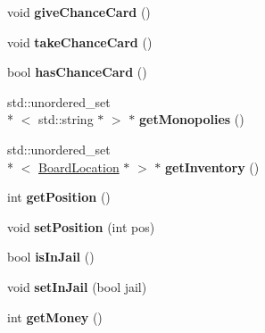 \begin{DoxyCompactItemize}
\item 
\hypertarget{classPlayer_a7433ae146d0c3dd73cb91ea5e96754f5}{void {\bfseries give\-Chance\-Card} ()}\label{classPlayer_a7433ae146d0c3dd73cb91ea5e96754f5}

\item 
\hypertarget{classPlayer_a15f319d424ddea1e7d52721a49b71709}{void {\bfseries take\-Chance\-Card} ()}\label{classPlayer_a15f319d424ddea1e7d52721a49b71709}

\item 
\hypertarget{classPlayer_a84e93bd5d7819117c065ead8218e346d}{bool {\bfseries has\-Chance\-Card} ()}\label{classPlayer_a84e93bd5d7819117c065ead8218e346d}

\item 
\hypertarget{classPlayer_abd9e6c52919dc2e1c31970e8e3e8bd03}{std\-::unordered\-\_\-set\\*
$<$ std\-::string $\ast$ $>$ $\ast$ {\bfseries get\-Monopolies} ()}\label{classPlayer_abd9e6c52919dc2e1c31970e8e3e8bd03}

\item 
\hypertarget{classPlayer_a29dd77d1aba8fba1f13318b90e635d63}{std\-::unordered\-\_\-set\\*
$<$ \hyperlink{classBoardLocation}{Board\-Location} $\ast$ $>$ $\ast$ {\bfseries get\-Inventory} ()}\label{classPlayer_a29dd77d1aba8fba1f13318b90e635d63}

\item 
\hypertarget{classPlayer_a67ac500ff74f722152ea44afcd29a7ab}{int {\bfseries get\-Position} ()}\label{classPlayer_a67ac500ff74f722152ea44afcd29a7ab}

\item 
\hypertarget{classPlayer_a953fad2e5c8bdfcae2b45788d11f9e61}{void {\bfseries set\-Position} (int pos)}\label{classPlayer_a953fad2e5c8bdfcae2b45788d11f9e61}

\item 
\hypertarget{classPlayer_a27bd43845e6c32701744c00bb1ef581d}{bool {\bfseries is\-In\-Jail} ()}\label{classPlayer_a27bd43845e6c32701744c00bb1ef581d}

\item 
\hypertarget{classPlayer_a379f3d46a85cf0d0425f7f49049cd925}{void {\bfseries set\-In\-Jail} (bool jail)}\label{classPlayer_a379f3d46a85cf0d0425f7f49049cd925}

\item 
\hypertarget{classPlayer_ac45154df7c4eb2d1d58255c3ff1c55dd}{int {\bfseries get\-Money} ()}\label{classPlayer_ac45154df7c4eb2d1d58255c3ff1c55dd}


\end{DoxyCompactItemize}
